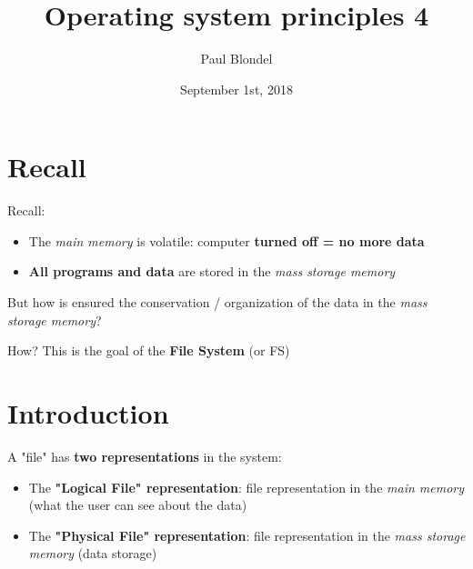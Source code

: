 \documentclass{beamer}[10pt, usepdftitle=false, handout]
\title{Operating system principles 4}
\author[]{Paul Blondel}
\institute[]{CNAM}
\date[]{September 1st, 2018}
\begin{document}
	{
	\begin{frame}
	\titlepage
	\end{frame}

	\section{Recall}

	\begin{frame}
	
	Recall:
	\vspace*{1em}	
	\begin{itemize}
	\item{The \textit{main memory} is volatile: computer \textbf{turned off = no more data}}	
	\item{\textbf{All programs and data} are stored in the \textit{mass storage memory}}
	\end{itemize}		
	
	\vspace*{1em}	
	
	But how is ensured the conservation / organization of the data in the \textit{mass storage memory}?	
	
	\vspace*{1em}	
	
	\begin{block}{How?}
	This is the goal of the \textbf{File System} (or FS) 	
	\end{block}	
		
	\end{frame}

	\section{Introduction}

	\begin{frame}
	A "file" has \textbf{two representations} in the system:
	\vspace*{1em}
	\begin{itemize}
	\item{The \textbf{"Logical File" representation}: file representation in the \textit{main memory} (what the user can see about the data)}
	\item{The \textbf{"Physical File" representation}: file representation in the \textit{mass storage memory} (data storage)} 
	\end{itemize}
		

\end{frame}}
\end{document}
